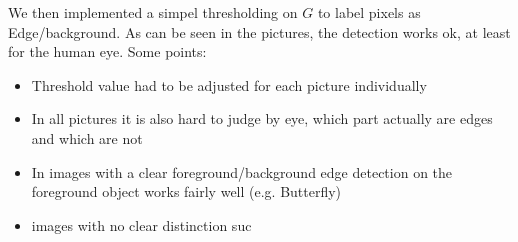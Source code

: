 \documentclass[11pt,a4paper]{article}
\begin{document}
We then implemented a simpel thresholding on $G$ to label pixels as Edge/background. As can be seen in the pictures, the detection works ok, at least for the human eye. Some points:
\begin{itemize}
\item Threshold value had to be adjusted for each picture individually
\item In all pictures it is also hard to judge by eye, which part actually are edges and which are not
\item In images with a clear foreground/background edge detection on the foreground object works fairly well (e.g. Butterfly)
\item images with no clear distinction suc
\end{itemize}
\begin{figure}%
\centering
{}
\quad

\end{figure}
\end{document}
